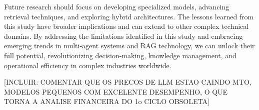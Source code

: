     Future research should focus on developing specialized models, advancing retrieval techniques, and exploring hybrid architectures. The lessons learned from this study have broader implications and can extend to other complex technical domains. By addressing the limitations identified in this study and embracing emerging trends in multi-agent systems and RAG technology, we can unlock their full potential, revolutionizing decision-making, knowledge management, and operational efficiency in complex industries worldwide.


    [INCLUIR: COMENTAR QUE OS PRECOS DE LLM ESTAO CAINDO MTO, MODELOS PEQUENOS COM EXCELENTE DESEMPENHO, O QUE TORNA A ANALISE FINANCEIRA DO 1o CICLO OBSOLETA]
